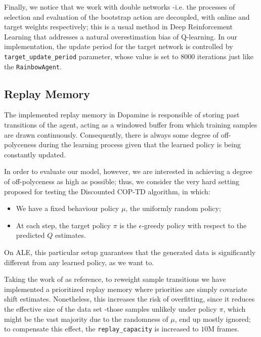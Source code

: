 \documentclass[12pt,a4paper,openright,twoside]{article}
\numberwithin{equation}{section}
\theoremstyle{definition}
\theoremstyle{remark}
\theoremstyle{plain}
\begin{document}
Finally, we notice that we work with double networks\cite{DoubleNetworks} -i.e. the processes of selection and evaluation of the bootstrap action are decoupled, with online and target weights respectively; this is a usual method in Deep Reinforcement Learning that addresses a natural overestimation bias of Q-learning\cite{Double}. In our implementation, the update period for the target network is controlled by \texttt{target\_update\_period} parameter, whose value is set to $8000$ iterations just like the \texttt{RainbowAgent}\cite{Rainbow}.




\subsection{Replay Memory}

The implemented replay memory in Dopamine\cite{dopamine} is responsible of storing past transitions of the agent, acting as a windowed buffer from which training samples are drawn continuously. Consequently, there is always some degree of off-polyceness during the learning process given that the learned policy is being constantly updated.

In order to evaluate our model, however, we are interested in achieving a degree of off-polyceness as high as possible; thus, we consider the very hard setting proposed for testing the Discounted COP-TD algorithm\cite{DCOPTD}, in which:
\begin{itemize}
	\item We have a fixed behaviour policy $\mu$, the uniformly random policy;
	\item At each step, the target policy $\pi$ is the $\epsilon$-greedy policy with respect to the predicted $Q$ estimates.
\end{itemize}
On ALE\cite{ALE}, this particular setup guarantees that the generated data is significantly different from any learned policy, as we want to.

Taking the work of \cite{DCOPTD} as reference, to reweight sample transitions we have implemented a prioritized replay memory\cite{Prioritized} where priorities are simply covariate shift estimates. Nonetheless, this increases the risk of overfitting, since it reduces the effective size of the data set -those samples unlikely under policy $\pi$, which might be the vast majority due to the randomness of $\mu$, end up mostly ignored; to compensate this effect, the \texttt{replay\_capacity} is increased to $10$M frames.
\end{document}
